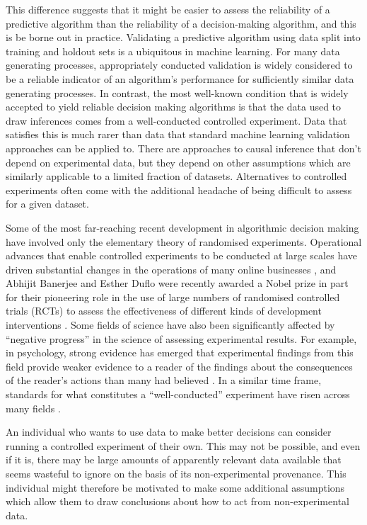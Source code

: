 This difference suggests that it might be easier to assess the reliability of a predictive algorithm than the reliability of a decision-making algorithm, and this is be borne out in practice. Validating a predictive algorithm using data split into training and holdout sets is a ubiquitous in machine learning. For many data generating processes, appropriately conducted validation is widely considered to be a reliable indicator of an algorithm's performance for sufficiently similar data generating processes. In contrast, the most well-known condition that is widely accepted to yield reliable decision making algorithms is that the data used to draw inferences comes from a well-conducted controlled experiment. Data that satisfies this is much rarer than data that standard machine learning validation approaches can be applied to. There are approaches to causal inference that don't depend on experimental data, but they depend on other assumptions which are similarly applicable to a limited fraction of datasets. Alternatives to controlled experiments often come with the additional headache of being difficult to assess for a given dataset.

Some of the most far-reaching recent development in algorithmic decision making have involved only the elementary theory of randomised experiments. Operational advances that enable controlled experiments to be conducted at large scales have driven substantial changes in the operations of many online businesses \citep{kohavi_surprising_2017}, and Abhijit Banerjee and Esther Duflo were recently awarded a Nobel prize in part for their pioneering role in the use of large numbers of randomised controlled trials (RCTs) to assess the effectiveness of different kinds of development interventions \citep{zhang_abdul_2014}. Some fields of science have also been significantly affected by ``negative progress'' in the science of assessing experimental results. For example, in psychology, strong evidence has emerged that experimental findings from this field provide weaker evidence to a reader of the findings about the consequences of the reader's actions than many had believed \citet{open_science_collaboration_estimating_2015,stroebe_what_2019}. In a similar time frame, standards for what constitutes a ``well-conducted'' experiment have risen across many fields \citep{nosek_preregistration_2018,liberati_prisma_2009}.

An individual who wants to use data to make better decisions can consider running a controlled experiment of their own. This may not be possible, and even if it is, there may be large amounts of apparently relevant data available that seems wasteful to ignore on the basis of its non-experimental provenance. This individual might therefore be motivated to make some additional assumptions which allow them to draw conclusions about how to act from non-experimental data.

